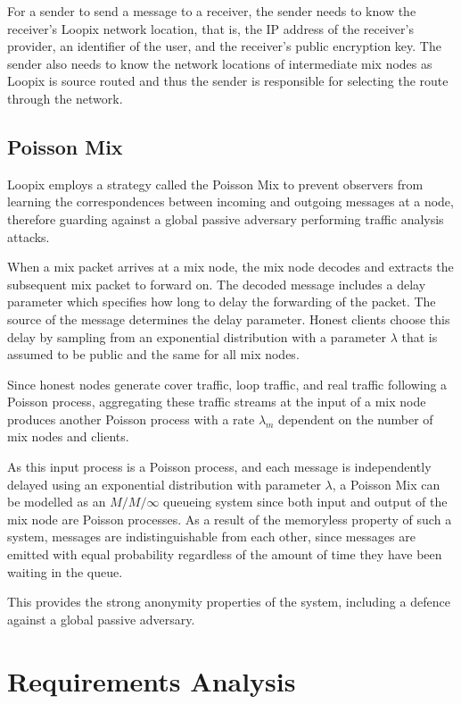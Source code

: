 \documentclass[final,dissertation.tex]{subfiles}
\begin{document}
For a sender to send a message to a receiver, the sender needs to know the receiver's Loopix network location, that is, the IP address of the receiver's provider, an identifier of the user, and the receiver's public encryption key. The sender also needs to know the network locations of intermediate mix nodes as Loopix is source routed and thus the sender is responsible for selecting the route through the network.

\subsection{Poisson Mix}

Loopix employs a strategy called the Poisson Mix to prevent observers from learning the correspondences between incoming and outgoing messages at a node, therefore guarding against a global passive adversary performing traffic analysis attacks. 

When a mix packet arrives at a mix node, the mix node decodes and extracts the subsequent mix packet to forward on. The decoded message includes a delay parameter which specifies how long to delay the forwarding of the packet. The source of the message determines the delay parameter. Honest clients choose this delay by sampling from an exponential distribution with a parameter $\lambda$ that is assumed to be public and the same for all mix nodes.

Since honest nodes generate cover traffic, loop traffic, and real traffic following a Poisson process, aggregating these traffic streams at the input of a mix node produces another Poisson process with a rate $\lambda_m$ dependent on the number of mix nodes and clients.

As this input process is a Poisson process, and each message is independently delayed using an exponential distribution with parameter $\lambda$, a Poisson Mix can be modelled as an $M/M/\infty$ queueing system since both input and output of the mix node are Poisson processes. As a result of the memoryless property of such a system, messages are indistinguishable from each other, since messages are emitted with equal probability regardless of the amount of time they have been waiting in the queue.

This provides the strong anonymity properties of the system, including a defence against a global passive adversary.

\section{Requirements Analysis}
\end{document}
